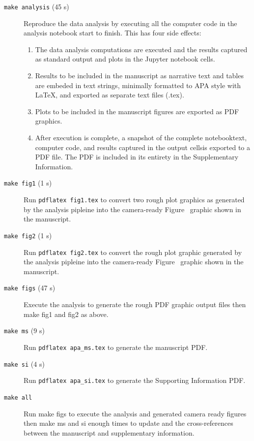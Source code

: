 \documentclass[helv,10pt,man,floatsintext]{apa6}  %
\begin{document}
\begin{description}

\item [\texttt{make analysis} (45 s)] Reproduce the data analysis by
  executing all the computer code in the analysis notebook start to
  finish. This has four side effects:

\begin{enumerate}
  \item The data analysis computations are executed and the results captured
    as standard output and plots in the Jupyter notebook cells. 
  \item Results to be included in the manuscript as narrative text and
    tables are embeded in text strings, minimally formatted to APA
    style with \LaTeX{}, and exported as separate text files (.tex).
  \item Plots to be included in the manuscript figures are exported as
    PDF graphics.
  \item After execution is complete, a snapshot of the complete
    notebook\textemdash text, computer code, and results captured in
    the output cells\textemdash is exported to a PDF file. The PDF is
    included in its entirety in the Supplementary Information.
\end{enumerate}  

\item [\texttt{make fig1} (1 s)] Run
  \texttt{pdflatex fig1.tex} to convert two rough plot
  graphics as generated by the analysis pipleine into the camera-ready
  Figure~ graphic shown in the manuscript.

\item [\texttt{make fig2} (1 s)] Run \texttt{pdflatex fig2.tex}
  to convert the rough plot graphic generated by the analysis
  pipleine into the camera-ready Figure~ graphic shown in the
  manuscript.

\item [\texttt{make figs} (47 s)] Execute the analysis to generate the rough PDF graphic
  output files then make fig1 and fig2 as above. 

\item [\texttt{make ms} (9 s)] Run \texttt{pdflatex apa_ms.tex}
  to generate the manuscript PDF.

\item [\texttt{make si} (4 s)] Run \texttt{pdflatex apa_si.tex}
   to generate the Supporting Information PDF.

\item [\texttt{make all}] Run make figs to execute the
  analysis and generated camera ready figures then make ms and si
  enough times to update and the cross-references between the
  manuscript and supplementary information.

\end{description}
\end{document}
